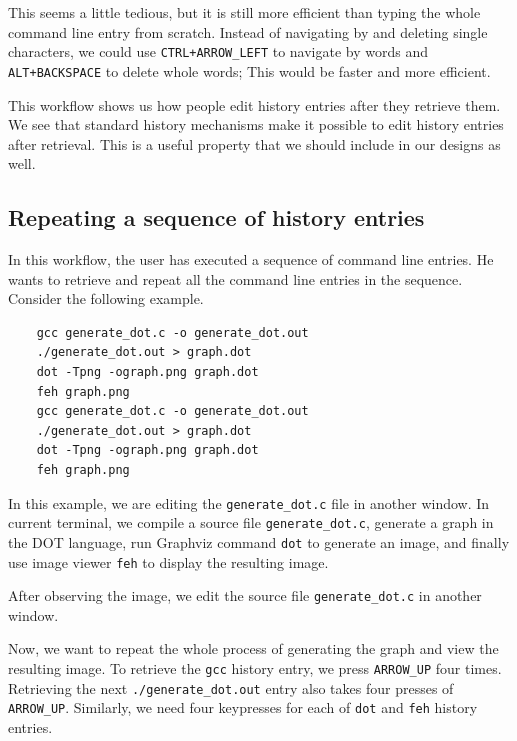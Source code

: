 This seems a little tedious, but it is still more efficient than typing the whole command line entry from scratch. Instead of navigating by and deleting single characters, we could use \verb|CTRL+ARROW_LEFT| to navigate by words and \verb|ALT+BACKSPACE| to delete whole words; This would be faster and more efficient. %

This workflow shows us how people edit history entries after they retrieve them. We see that standard history mechanisms make it possible to edit history entries after retrieval. %
This is a useful property that we should include in our designs as well. 

\subsection{Repeating a sequence of history entries}\label{workflow-repeating-a-sequence}

In this workflow, the user has executed a sequence of command line entries. He wants to retrieve and repeat all the command line entries in the sequence. 
Consider the following example.

\begin{verbatim}
    gcc generate_dot.c -o generate_dot.out
    ./generate_dot.out > graph.dot
    dot -Tpng -ograph.png graph.dot
    feh graph.png
    gcc generate_dot.c -o generate_dot.out
    ./generate_dot.out > graph.dot
    dot -Tpng -ograph.png graph.dot
    feh graph.png
\end{verbatim}

In this example, we are editing the \verb|generate_dot.c| file in another window. In current terminal, we compile a source file \verb|generate_dot.c|, generate a graph in the DOT\cite{graphvizthedotlanguage} language, run Graphviz\cite{ellson2001graphviz} command \verb|dot| to generate an image, and finally use image viewer \verb|feh|\cite{toolsfeh} to display the resulting image.

After observing the image, we edit the source file \verb|generate_dot.c| in another window.


Now, we want to repeat the whole process of generating the graph and view the resulting image. To retrieve the \verb|gcc| history entry, we press \verb|ARROW_UP| four times. Retrieving the next \verb|./generate_dot.out| entry also takes four presses of \verb|ARROW_UP|. Similarly, we need four keypresses for each of \verb|dot| and \verb|feh| history entries. 

